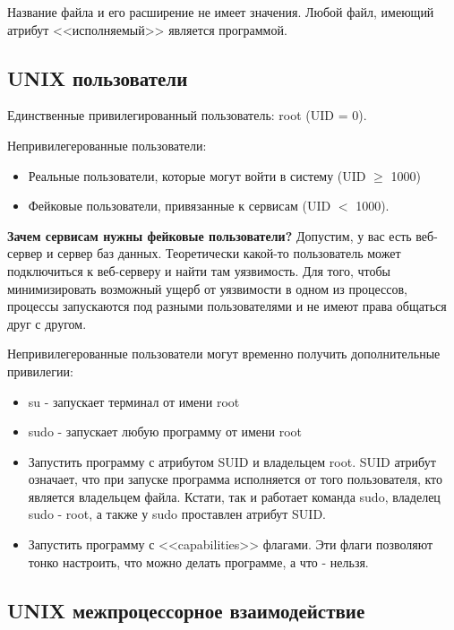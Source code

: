 \begin{multicols}{2}
      Название файла и его расширение не имеет значения. Любой файл, имеющий атрибут 
      <<исполняемый>> является программой.

      \subsection*{UNIX пользователи}

      Единственные привилегированный пользователь: root (UID = 0).

      Непривилегерованные пользователи:
      \begin{itemize}
        \item Реальные пользователи, которые могут войти в систему (UID $\ge$ 1000)
        \item Фейковые пользователи, привязанные к сервисам (UID $<$ 1000).
      \end{itemize}

      \textbf{Зачем сервисам нужны фейковые пользователи?}
      Допустим, у вас есть веб-сервер и сервер баз данных. Теоретически какой-то пользователь
      может подключиться к веб-серверу и найти там уязвимость. Для того, чтобы 
      минимизировать возможный ущерб от уязвимости в одном из процессов, процессы запускаются
      под разными пользователями и не имеют права общаться друг с другом.

      Непривилегерованные пользователи могут временно получить 
      дополнительные привилегии:

      \begin{itemize}
        \item su - запускает терминал от имени root
        \item sudo - запускает любую программу от имени root
        \item Запустить программу с атрибутом SUID и владельцем root. SUID атрибут означает, что при запуске программа
        исполняется от того пользователя, кто является владельцем файла. Кстати, так и 
        работает команда sudo, владелец sudo - root, а также у sudo проставлен атрибут SUID.
        \item Запустить программу с <<capabilities>> флагами. Эти флаги позволяют тонко настроить, что можно делать программе, а что - нельзя.
      \end{itemize}

      \subsection*{UNIX межпроцессорное взаимодействие}


\end{multicols}
